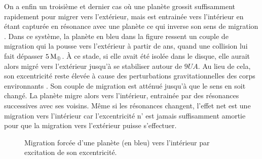 \bigskip

On a enfin un troisième et dernier cas où une planète grossit suffisamment rapidement pour migrer vers l'extérieur, mais est entrainée vers l'intérieur en étant capturée en résonance avec une planète ce qui inverse son sens de migration . Dans ce système, la planète en bleu dans la figure ressent un couple de migration qui la pousse vers l'extérieur à partir de  ans, quand une collision lui fait dépasser $5\mathrm{\thinspace M_\oplus}$. À ce stade, si elle avait été isolée dans le disque, elle aurait alors migré vers l'extérieur jusqu'à se stabiliser autour de $9\unit{UA}$. Au lieu de cela, son excentricité reste élevée à cause des perturbations gravitationnelles des corps environnants . Son couple de migration est atténué jusqu'à que le sens en soit changé. La planète migre alors vers l'intérieur, entrainée par des résonances successives avec ses voisins. Même si les résonances changent, l'effet net est une migration vers l'intérieur car l'excentricité n'
est jamais suffisamment amortie pour que la migration vers l'extérieur puisse s'effectuer.

\begin{figure}[htbp]
\centering
{}\hfill
{}
\caption[Amortissement du couple de corotation d'un noyau de planète géante.]{Migration forcée d'une planète (en bleu) vers
l'intérieur par excitation de son excentricité.}\label{fig:HSE_forced_in}
\end{figure}%

